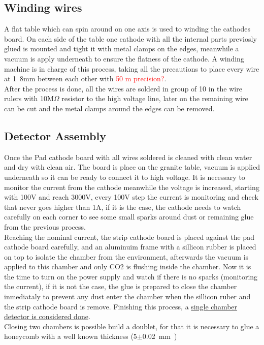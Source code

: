 \subsection{Winding wires}
A flat table which can spin around on one axis is used to winding the cathodes board. On each side of the table one cathode with all the internal parts
previosly glued is mounted and tight it with metal clamps on the edges, meanwhile a vacuum is apply underneath to ensure the flatness of the cathode.
A winding machine is in charge of this process, taking all the precautions to place every wire at \unit{1.8}{mm} between each other with \textcolor{red}{\unit{50}{\micro
m} precision?}.\\
After the process is done, all the wires are solderd in group of 10 in the wire rulers with \unit{10}{M$\Omega$} resistor to the high voltage line, later on the
remaining wire can be cut and the metal clamps around the edges can be removed. 


\subsection{Detector Assembly}

Once the Pad cathode board with all wires soldered is cleaned with clean water and dry with clean air. The board is place on the granite table, vacuum is
applied underneath so it can be ready to connect it to high voltage. It is necessary to monitor the current from the cathode meanwhile the voltage is increased,
starting with 100V and reach 3000V, every 100V step the current is monitoring and check that never goes higher than \unit{1}{\micro A}, if it is the case, the
cathode needs to watch carefully on each corner to see some small sparks around dust or remaining glue from the previous process.\\
Reaching the nominal current, the strip cathode board is placed against the pad cathode board carefully, and an aluminuim frame with a sillicon rubber is placed
on top to isolate the chamber from the environment, afterwards the vacuum is applied to this chamber and only CO2 is flushing inside the chamber. Now it is the
time to turn on the power supply and watch if there is no sparks (monitoring the current), if it is not the case, the glue is prepared to close the chamber
inmediataly to prevent any dust enter the chamber when the sillicon ruber and the strip cathode board is remove. Finishing this process, a \underline{single chamber
detector is considered done}.\\
Closing two chambers is possible build a doublet, for that it is necessary to glue a honeycomb with a well known thickness (\unit{5$\pm$0.02}{mm}) 



